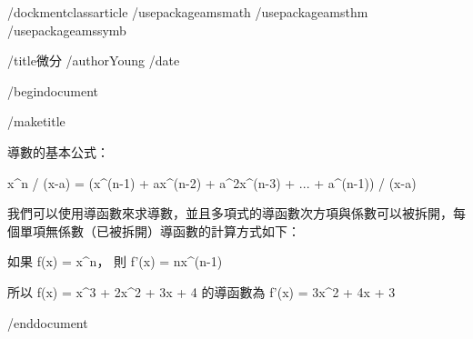 /dockmentclass{article}
/usepackage{amsmath}
/usepackage{amsthm}
/usepackage{amssymb}

/title{微分}
/author{Young}
/date{}

/begin{document}

/maketitle

導數的基本公式：

x^n / (x-a) = (x^(n-1) + ax^(n-2) + a^2x^(n-3) + ... + a^(n-1)) / (x-a)

我們可以使用導函數來求導數，並且多項式的導函數次方項與係數可以被拆開，每個單項無係數（已被拆開）導函數的計算方式如下：

如果 f(x) = x^n， 則 f'(x) = nx^(n-1)

所以 f(x) = x^3 + 2x^2 + 3x + 4 的導函數為 f'(x) = 3x^2 + 4x + 3

/end{document}
